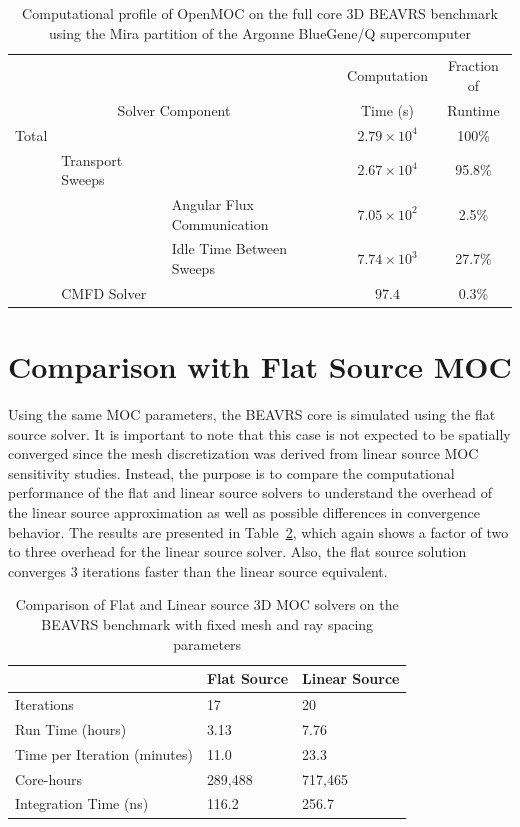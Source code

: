 \begin{table}[ht]
	\centering
	\caption{Computational profile of OpenMOC on the full core 3D BEAVRS benchmark using the Mira partition of the Argonne BlueGene/Q supercomputer}
	\medskip
	\begin{tabular}{lll|c|c}
		\hline
		& & & Computation & Fraction of \\
		\multicolumn{3}{c|}{Solver Component} & Time (s) & Runtime\\
		\hline
		Total & & & $2.79 \times 10^4$ & 100\% \\
		& Transport Sweeps & & $2.67 \times 10^4$ & 95.8\% \\
		& & Angular Flux Communication & $7.05 \times 10^2$ & 2.5\% \\
		& & Idle Time Between Sweeps & $7.74 \times 10^3$ & 27.7\% \\
		& CMFD Solver & & $97.4$ & 0.3\% \\		
		\hline
	\end{tabular}
	\label{tab:full-core-comp-prof}
\end{table}


\section{Comparison with Flat Source MOC}
\label{sec:fc-flat-source}

Using the same \ac{MOC} parameters, the BEAVRS core is simulated using the flat source solver. It is important to note that this case is not expected to be spatially converged since the mesh discretization was derived from linear source \ac{MOC} sensitivity studies. Instead, the purpose is to compare the computational performance of the flat and linear source solvers to understand the overhead of the linear source approximation as well as possible differences in convergence behavior. The results are presented in Table~\ref{tab:fc-comp-flat-linear}, which again shows a factor of two to three overhead for the linear source solver. Also, the flat source solution converges 3 iterations faster than the linear source equivalent. 

\begin{table}[ht]
	\centering
	\caption{Comparison of Flat and Linear source 3D \ac{MOC} solvers on the BEAVRS benchmark with fixed mesh and ray spacing parameters}
	\medskip
	\begin{tabular}{l|l|l}
		\hline
		 & Flat Source & Linear Source \\
		\hline
		Iterations & 17 & 20 \\
		Run Time (hours) & 3.13 & 7.76 \\
		Time per Iteration (minutes) & 11.0 & 23.3 \\
		Core-hours & 289,488 & 717,465 \\
		Integration Time (ns) & 116.2 & 256.7 \\
		\hline
	\end{tabular}
	\label{tab:fc-comp-flat-linear}
\end{table}


